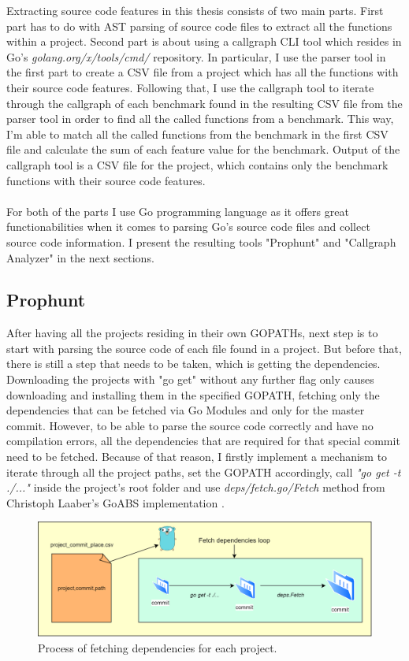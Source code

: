 \documentclass{seal_thesis}
\begin{document}
\noindent Extracting source code features in this thesis consists of two main parts. First part has to do with AST parsing of source code files to extract all the functions within a project. Second part is about using a callgraph CLI tool which resides in Go's \textit{golang.org/x/tools/cmd/} repository\cite{callgraphtool}. In particular, I use the parser tool in the first part to create a CSV file from a project which has all the functions with their source code features. Following that, I use the callgraph tool to iterate through the callgraph of each benchmark found in the resulting CSV file from the parser tool in order to find all the called functions from a benchmark. This way, I'm able to match all the called functions from the benchmark in the first CSV file and calculate the sum of each feature value for the benchmark. Output of the callgraph tool is a CSV file for the project, which contains only the benchmark functions with their source code features.\\
\\
For both of the parts I use Go programming language as it offers great functionabilities when it comes to parsing Go's source code files and collect source code information. I present the resulting tools "Prophunt" and "Callgraph Analyzer" in the next sections.

\subsection{Prophunt}
\label{Prophunt}
After having all the projects residing in their own GOPATHs, next step is to start with parsing the source code of each file found in a project. But before that, there is still a step that needs to be taken, which is getting the dependencies. Downloading the projects with "go get" without any further flag only causes downloading and installing them in the specified GOPATH, fetching only the dependencies that can be fetched via Go Modules and only for the master commit. However, to be able to parse the source code correctly and have no compilation errors, all the dependencies that are required for that special commit need to be fetched. Because of that reason, I firstly implement a mechanism to iterate through all the project paths, set the GOPATH accordingly, call \textit{"go get -t ./..."} inside the project's root folder and use \textit{deps/fetch.go/Fetch} method from Christoph Laaber's GoABS implementation \cite{sealuzh/goabs}.

\begin{figure}[H]
	\centering
	\includegraphics[width=\linewidth]{fetchdeps}
	\caption{Process of fetching dependencies for each project.}
	\label{fig:fetchdeps}
\end{figure}
\end{document}

